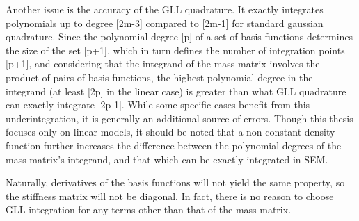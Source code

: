 Another issue is the accuracy of the GLL quadrature. It exactly integrates polynomials up to degree
[2m-3] compared to [2m-1] for standard gaussian quadrature. Since the polynomial degree [p] of a
set of basis functions determines the size of the set [p+1], which in turn defines the number of
integration points [p+1], and considering that the integrand of the mass matrix involves
the product of pairs of basis functions, the highest polynomial degree in the integrand
(at least [2p] in the linear case) is greater than what GLL quadrature can exactly integrate [2p-1].
While some specific cases benefit from this underintegration, it is generally an additional
source of errors. Though this thesis focuses only on linear models, it should be noted that
a non-constant density function further increases the difference between the polynomial
degrees of the mass matrix's integrand, and that which can be exactly integrated in SEM.

Naturally, derivatives of the basis functions will not yield the same property, so the
stiffness matrix will not be diagonal. In fact, there is no reason to choose GLL integration for
any terms other than that of the mass matrix.